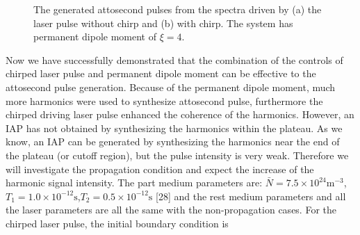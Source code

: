 \documentclass[10pt,letterpaper]{article}
\begin{document}
\begin{figure}[!htbp]
	\centering
	\caption{The generated attosecond pulses from the spectra driven by (a) the laser pulse without chirp and (b) with chirp. The system has permanent dipole moment of $ \xi=4 $.}
	\label{fig5}
\end{figure}	

Now we have successfully demonstrated that the combination of the controls of chirped laser pulse and permanent dipole moment can be effective to the attosecond pulse generation. Because of the permanent dipole moment, much more harmonics were used to synthesize attosecond pulse, furthermore the chirped driving laser pulse enhanced the coherence of the harmonics. However, an IAP has not obtained by synthesizing the harmonics within the plateau. As we know, an IAP can be generated by synthesizing the harmonics near the end of the plateau (or cutoff region), but the pulse intensity is very weak. Therefore we will investigate the propagation condition and expect the increase of the harmonic signal intensity. The part medium parameters are: $ \bar{N}=7.5\times10^{24} \textrm{m}^{-3}$, $ T_{1}=1.0\times10^{-12} \textrm{s} $,$ T_{2}=0.5\times10^{-12} \textrm{s} $ [28] and the rest medium parameters and all the laser parameters are all the same with the non-propagation cases. For the chirped laser pulse, the initial boundary condition is
\end{document}
